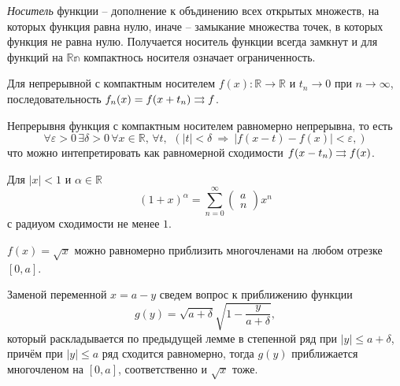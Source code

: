 
\textit{Носитель} функции -- дополнение к объдинению всех открытых множеств, на которых функция равна нулю, иначе -- замыкание множества точек, в которых функция не равна нулю. Получается носитель функции всегда замкнут и для функций на $\mathbb{Rn}$ компактнось носителя означает ограниченность. 

\begin{to_lem}
    Для непрерывной с компактным носителем $f(x) \colon \mathbb{R} \to \mathbb{R}$ и $t_n \to 0$ при $n \to \infty$, последовательность $f_n(x) = f(x + t_n) \rightrightarrows f$.
\end{to_lem}

\begin{uproof}
Непрерывня функция с компактным носителем равномерно непрерывна, то есть
\begin{equation*}
    \forall \varepsilon > 0 \,  \exists \delta > 0 \, \forall x \in \mathbb{R},\, \forall t,\, \ 
    \left(
        |t| < \delta \ \Rightarrow \ |f(x-t) - f(x)| < \varepsilon,
    \right)
\end{equation*}
что можно интепретировать как равномерной сходимости $f(x-t_n) \rightrightarrows f(x)$. 
\end{uproof}


\begin{to_thr}[]
    Для $|x| < 1$ и $\alpha \in \mathbb{R}$ $$(1+x)^\alpha = \sum_{n=0}^{\infty} \begin{pmatrix}
        a \\ n
    \end{pmatrix} x^n$$ с радиуом сходимости не менее $1$. 
\end{to_thr}

\begin{to_lem}
    $f(x) = \sqrt{x}$ можно равномерно приблизить многочленами на любом отрезке $[0,a]$.
\end{to_lem}

\begin{uproof}
    Заменой переменной $x = a -y$ сведем вопрос к приближению функции
    \begin{equation*}
        g(y) = \sqrt{a + \delta} \sqrt{1 - \frac{y}{a+\delta}},
    \end{equation*}
    который раскладывается по предыдущей лемме в степенной ряд при $|y| \leq a + \delta$, причём при $|y| \leq a$ ряд сходится равномерно, тогда $g(y)$ приближается многочленом на $[0, a]$, соответственно и $\sqrt{x}$ тоже. 
\end{uproof}


